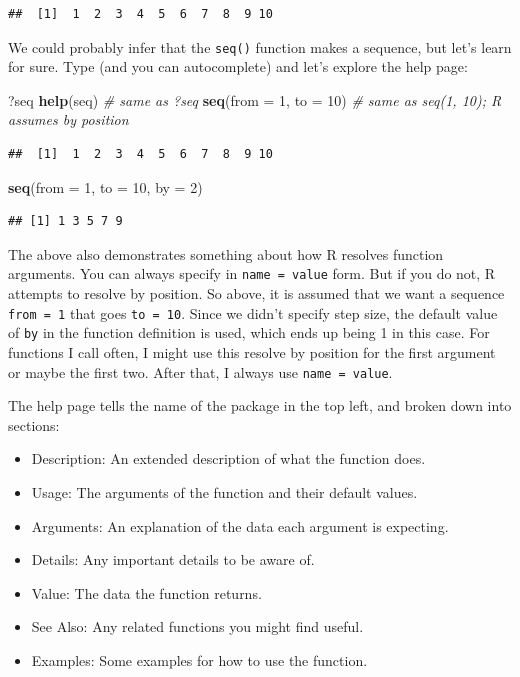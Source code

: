 \documentclass[]{book}
\newenvironment{Shaded}{\begin{snugshade}}{\end{snugshade}}
\newcommand{\KeywordTok}[1]{\textcolor[rgb]{0.13,0.29,0.53}{\textbf{{#1}}}}
\newcommand{\DataTypeTok}[1]{\textcolor[rgb]{0.13,0.29,0.53}{{#1}}}
\newcommand{\DecValTok}[1]{\textcolor[rgb]{0.00,0.00,0.81}{{#1}}}
\newcommand{\CommentTok}[1]{\textcolor[rgb]{0.56,0.35,0.01}{\textit{{#1}}}}
\newcommand{\NormalTok}[1]{{#1}}
\providecommand{\tightlist}{%
  \setlength{\itemsep}{0pt}\setlength{\parskip}{0pt}}
\theoremstyle{definition}
\theoremstyle{definition}
\theoremstyle{definition}
\theoremstyle{remark}
\begin{document}
\begin{verbatim}
##  [1]  1  2  3  4  5  6  7  8  9 10
\end{verbatim}

We could probably infer that the \texttt{seq()} function makes a
sequence, but let's learn for sure. Type (and you can autocomplete) and
let's explore the help page:

\begin{Shaded}
\begin{Highlighting}[]
\NormalTok{?seq }
\KeywordTok{help}\NormalTok{(seq) }\CommentTok{# same as ?seq}
\KeywordTok{seq}\NormalTok{(}\DataTypeTok{from =} \DecValTok{1}\NormalTok{, }\DataTypeTok{to =} \DecValTok{10}\NormalTok{) }\CommentTok{# same as seq(1, 10); R assumes by position}
\end{Highlighting}
\end{Shaded}

\begin{verbatim}
##  [1]  1  2  3  4  5  6  7  8  9 10
\end{verbatim}

\begin{Shaded}
\begin{Highlighting}[]
\KeywordTok{seq}\NormalTok{(}\DataTypeTok{from =} \DecValTok{1}\NormalTok{, }\DataTypeTok{to =} \DecValTok{10}\NormalTok{, }\DataTypeTok{by =} \DecValTok{2}\NormalTok{)}
\end{Highlighting}
\end{Shaded}

\begin{verbatim}
## [1] 1 3 5 7 9
\end{verbatim}

The above also demonstrates something about how R resolves function
arguments. You can always specify in \texttt{name\ =\ value} form. But
if you do not, R attempts to resolve by position. So above, it is
assumed that we want a sequence \texttt{from\ =\ 1} that goes
\texttt{to\ =\ 10}. Since we didn't specify step size, the default value
of \texttt{by} in the function definition is used, which ends up being 1
in this case. For functions I call often, I might use this resolve by
position for the first argument or maybe the first two. After that, I
always use \texttt{name\ =\ value}.

The help page tells the name of the package in the top left, and broken
down into sections:

\begin{itemize}
\tightlist
\item
  Description: An extended description of what the function does.
\item
  Usage: The arguments of the function and their default values.
\item
  Arguments: An explanation of the data each argument is expecting.
\item
  Details: Any important details to be aware of.
\item
  Value: The data the function returns.
\item
  See Also: Any related functions you might find useful.
\item
  Examples: Some examples for how to use the function.
\end{itemize}
\end{document}
